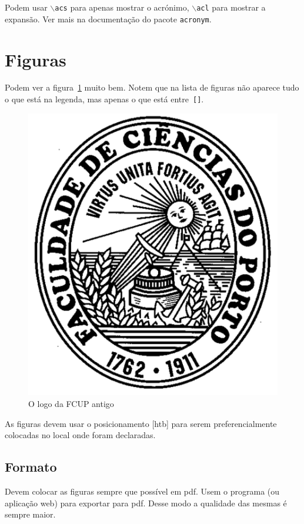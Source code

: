 Podem usar $\backslash$\texttt{acs} para apenas mostrar o acrónimo, 
$\backslash$\texttt{acl} para mostrar a expansão. Ver mais na documentação do 
pacote \texttt{acronym}.

\section{Figuras}

Podem ver a figura~\ref{fig:logoFCUP} muito bem. Notem que na lista de figuras 
não aparece tudo o que está na legenda, mas apenas o que está entre~\texttt{[]}.

\begin{figure}[htb]
   \centering %
   \includegraphics[scale=.4]{pics/fc_logo}
   \caption[FCUP logo velho]{O logo da FCUP antigo}\label{fig:logoFCUP}
\end{figure}

As figuras devem usar o posicionamento [htb] para serem preferencialmente colocadas no local onde foram declaradas.

\subsection{Formato}
    Devem colocar as figuras sempre que possível em pdf. Usem o programa (ou aplicação web) para exportar para pdf. Desse modo a qualidade das mesmas é sempre maior.

